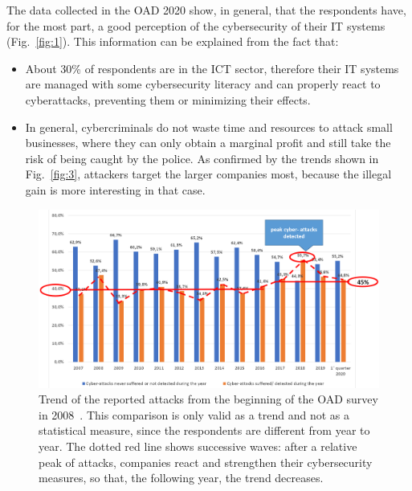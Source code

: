 \documentclass{easychair}
\begin{document}
The data collected in the OAD 2020 show, in general, that the respondents have, for the most part,
a good perception of the cybersecurity of their IT systems (Fig.~\ref{fig:1}).
This information can be explained from the fact that:
 
\begin{itemize}
\item About 30\% of respondents are in the ICT sector, therefore their IT systems
  are managed with some cybersecurity literacy and can properly react to cyberattacks, preventing 
  them or minimizing their effects.

\item In general, cybercriminals do not waste time and resources to attack small businesses,
  where they can only obtain a marginal profit and still
  take the risk of being caught by the police.  As confirmed by the trends shown
  in Fig.~\ref{fig:3}, attackers target the larger companies most,
  because the illegal gain is more interesting in that case.
\end{itemize}


\begin{figure}
  \centering
  \includegraphics[width=1\textwidth]{pictures/fig2.png}
  \caption{Trend of the reported attacks from the beginning of the OAD survey
    in 2008~\cite{oad20}. This comparison is only valid as a trend and not as a statistical
    measure, since the respondents are different from year to year. The dotted red line shows
    successive waves: after a relative peak of attacks, companies react and strengthen
    their cybersecurity measures, so that, the following year, the trend decreases.}
  \label{fig:2}
\end{figure}
\end{document}
